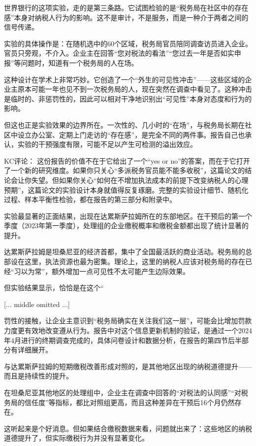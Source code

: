 \documentclass[11pt]{ctexart}
\begin{document}
世界银行的这项实验，走的是第三条路。它试图检验的是“税务局在社区中的存在感”本身对纳税人行为的影响。这不是审计，不是服务，而是一种介于两者之间的信号传递。

实验的具体操作是：在随机选中的60个区域，税务局官员陪同调查访员进入企业。官员只旁观，不介入。企业主在回答“您对税法的看法”“您过去一年是否如实申报”等问题时，知道有一个税务局的人在场。

这种设计在学术上非常巧妙。它创造了一个“外生的可见性冲击”——这些区域的企业主原本可能一年也见不到一次税务局的人，现在突然在调查中看见了。这种冲击是临时的、非惩罚性的，因此可以相对干净地识别出“可见性”本身对态度和行为的影响。

但这也正是实验效果的边界所在。一次性的、几小时的“在场”，与税务局长期在社区中设立办公室、定期上门走访的“存在感”，是完全不同的两件事。报告自己也承认，实验的干预强度有限，可能不足以产生可检测的溢出效应。

KC评论： 这份报告的价值不在于它给出了一个“yes or no”的答案，而在于它打开了一个新的研究维度。如果你只关心“多派税务官员能不能多收税”，这篇论文的结论会让你失望。但如果你关心“如何在不增加执法成本的前提下改变纳税人的心理预期”，这篇论文的实验设计本身就值得反复琢磨。完整的实验设计细节、随机化过程、样本平衡性检验，都在报告的第三部分和附录中。

实验最显著的正面结果，出现在达累斯萨拉姆所在的东部地区。在干预后的第一个季度（2023年第一季度），处理组的企业缴税概率和缴税金额都出现了统计显著的提升。

达累斯萨拉姆是坦桑尼亚的经济首都，集中了全国最活跃的商业活动。税务局的总部设在这里，执法资源也最为密集。理论上，这里的纳税人应该对税务局的存在已经“习以为常”，额外增加一点可见性不太可能产生边际效果。

但实验结果显示，恰恰是在这个“

[... middle omitted ...]

罚性的接触，让企业主意识到“税务局确实在关注我们这一层”，可能会比增加罚款力度更有效地改变遵从行为。报告中对这个信息更新机制的验证，是通过一个2024年4月进行的终期调查完成的，具体问卷设计和数据分析，在报告的第四节后半部分有详细展开。

与达累斯萨拉姆的短期缴税改善形成对照的，是其他地区出现的纳税道德提升——而且是持续性的提升。

在坦桑尼亚其他地区的处理组中，企业主在调查中回答的“对税法的认同感”“对税务局的信任度”等指标，都比对照组更高，而且这种差异在干预后16个月仍然存在。

这听起来是个好消息。但如果结合缴税数据来看，问题就出来了：这些地区的纳税道德提升了，但实际缴税行为并没有显著变化。
\end{document}
